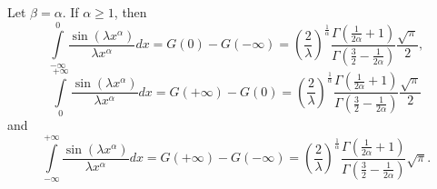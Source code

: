\documentclass[smallextended]{svjour3}
\begin{document}
\begin{corollary}
Let $\beta=\alpha$. If $\alpha\ge1$, then
\begin{equation}
\int\limits_{-\infty}^{0} \frac{\sin{(\lambda x^\alpha)
}}{\lambda x^\alpha}dx=G(0)-G(-\infty)=\left(\frac{2}{\lambda}\right)^{\frac{1}{\alpha}}\frac{\Gamma\left(\frac{1}{2\alpha}+1\right)}{\Gamma\left(\frac{3}{2}-\frac{1}{2\alpha}\right)}\frac{\sqrt{\pi}}{2},
\label{Crl1-1}
\end{equation}
\begin{equation}
\int\limits_{0}^{+\infty} \frac{\sin{(\lambda x^\alpha)
}}{\lambda x^\alpha}dx=G(+\infty)-G(0)=\left(\frac{2}{\lambda}\right)^{\frac{1}{\alpha}}\frac{\Gamma\left(\frac{1}{2\alpha}+1\right)}{\Gamma\left(\frac{3}{2}-\frac{1}{2\alpha}\right)}\frac{\sqrt{\pi}}{2}
\label{Crl1-2}
\end{equation}
and
\begin{equation}
\int\limits_{-\infty}^{+\infty} \frac{\sin{(\lambda x^\alpha)
}}{\lambda x^\alpha}dx=G(+\infty)-G(-\infty)=\left(\frac{2}{\lambda}\right)^{\frac{1}{\alpha}}\frac{\Gamma\left(\frac{1}{2\alpha}+1\right)}{\Gamma\left(\frac{3}{2}-\frac{1}{2\alpha}\right)}\sqrt{\pi}.
\label{Crl1-3}
\end{equation}
\label{Crl1}
\end{corollary}
\end{document}
